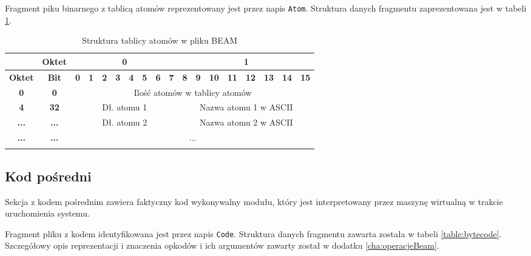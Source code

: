 Fragment piku binarnego z tablicą atomów reprezentowany jest przez napis \texttt{Atom}. Struktura danych fragmentu zaprezentowana jest w tabeli \ref{table:atomTable}.

\begin{longtable}{|c|c|c|c|c|c|c|c|c|c|c|c|c|c|c|c|c|c|}
\hline
         & \textbf{Oktet} & \multicolumn{8}{|c|}{\textbf{0}} & \multicolumn{8}{|c|}{\textbf{1}} \\
\hline
\textbf{Oktet} & \textbf{Bit} & \textbf{0} & \textbf{1} & \textbf{2} & \textbf{3} & \textbf{4} & \textbf{5} & \textbf{6} & \textbf{7} & \textbf{8} & \textbf{9} & \textbf{10} & \textbf{11} & \textbf{12} & \textbf{13} & \textbf{14} & \textbf{15}\\
\hline
\textbf{0} & \textbf{0} & \multicolumn{16}{|c|}{Ilość atomów w tablicy atomów} \\[3ex]
\hline
\textbf{4} & \textbf{32} & \multicolumn{8}{|c|}{Dł. atomu 1} & \multicolumn{8}{|c|}{Nazwa atomu 1 w ASCII}\\[3ex]
\hline
\textbf{...} & \textbf{...} & \multicolumn{8}{|c|}{Dł. atomu 2} & \multicolumn{8}{|c|}{Nazwa atomu 2 w ASCII}\\[3ex]
\hline
\textbf{...} & \textbf{...} & \multicolumn{16}{|c|}{...} \\[3ex]
\hline
\caption{Struktura tablicy atomów w pliku BEAM}
\label{table:atomTable} \\
\end{longtable}

\subsection{Kod pośredni}
Sekcja z kodem pośrednim zawiera faktyczny kod wykonywalny modułu, który jest interpretowany przez maszynę wirtualną w trakcie uruchomienia systemu.

Fragment pliku z kodem identyfikowana jest przez napis \texttt{Code}. Struktura danych fragmentu zawarta została w tabeli \ref{table:bytecode}. Szczegółowy opis reprezentacji i znaczenia opkodów i ich argumentów zawarty został w dodatku \ref{cha:operacjeBeam}.

